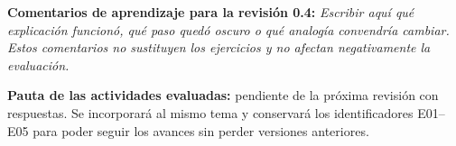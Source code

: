 \documentclass[
  spanish,
  10pt,
  a4paper,
]{article}
\begin{document}
\textbf{Comentarios de aprendizaje para la revisión 0.4:} \emph{Escribir
aquí qué explicación funcionó, qué paso quedó oscuro o qué analogía
convendría cambiar. Estos comentarios no sustituyen los ejercicios y no
afectan negativamente la evaluación.}

\textbf{Pauta de las actividades evaluadas:} pendiente de la próxima
revisión con respuestas. Se incorporará al mismo tema y conservará los
identificadores E01--E05 para poder seguir los avances sin perder
versiones anteriores.
\end{document}
